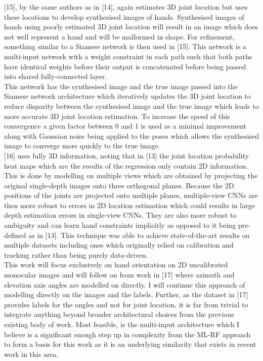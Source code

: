 \documentclass{article}
\begin{document}
[15], by the same authors as in [14], again estimates 3D joint location but uses these locations to develop synthesised images of hands. Synthesised images of hands using poorly estimated 3D joint location will result in an image which does not well represent a hand and will be malformed in shape. For refinement, something similar to a Siamese network is then used in [15]. This network is a multi-input network with a weight constraint in each path such that both paths have identical weights before their output is concatenated before being passed into shared fully-connected layer.\\

This network has the synthesised image and the true image passed into the Siamese network architecture which iteratively updates the 3D joint location to reduce disparity between the synthesised image and the true image which leads to more accurate 3D joint location estimation. To increase the speed of this convergence a given factor between 0 and 1 is used as a minimal improvement along with Gaussian noise being applied to the poses which allows the synthesised image to converge more quickly to the true image.\\

[16] uses fully 3D information, noting that in [13] the joint location probability heat maps which are the results of the regression only contain 2D information. This is done by modelling on multiple views which are obtained by projecting the original single-depth images onto three orthogonal planes. Because the 2D positions of the joints are projected onto multiple planes, multiple-view CNNs are then more robust to errors in 2D location estimation which could results in large depth estimation errors in single-view CNNs. They are also more robust to ambiguity and can learn hand constraints implicitly as opposed to it being pre-defined as in [13]. This technique was able to achieve state-of-the-art results on multiple datasets including ones which originally relied on calibration and tracking rather than being purely data-driven.\\

This work will focus exclusively on hand orientation on 2D uncalibrated monocular images and will follow on from work in [17] where azimuth and elevation axis angles are modelled on directly. I will continue this approach of modelling directly on the images and the labels. Further, as the dataset in [17] provides labels for the angles and not for joint location, it is far from trivial to integrate anything beyond broader architectural choices from the previous existing body of work. Most feasible, is the multi-input architecture which I believe is a significant enough step up in complexity from the ML-RF approach to form a basis for this work as it is an underlying similarity that exists in recent work in this area. \\
\end{document}
